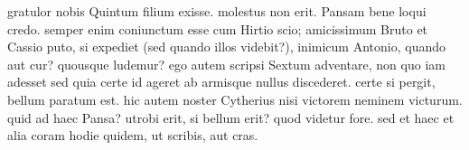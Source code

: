 


 gratulor nobis Quintum filium exisse. molestus non erit. Pansam bene loqui credo. semper enim coniunctum esse cum Hirtio scio; amicissimum Bruto et Cassio puto, si expediet (sed quando illos videbit?), inimicum Antonio, quando aut cur? quousque ludemur? ego autem scripsi Sextum adventare, non quo iam adesset sed quia certe id ageret ab armisque nullus discederet. certe si pergit, bellum paratum est. hic autem noster Cytherius nisi victorem neminem victurum. quid ad haec Pansa? utrobi erit, si bellum erit? quod videtur fore. sed et haec et alia coram hodie quidem, ut scribis, aut cras.
